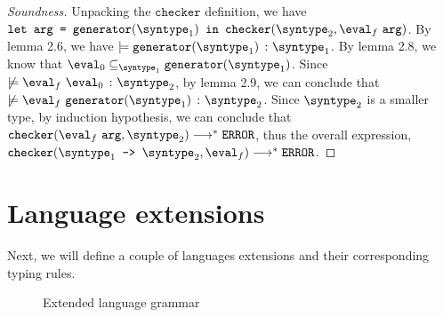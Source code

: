 \begin{proof}[Soundness]
  Unpacking the $\texttt{checker}$ definition, we have $\letin{\texttt{arg}}{\mkgen{\syntype_1}}{\mkche{\syntype_2}{\eval_f \ \texttt{arg}}}$. By lemma 2.6, we have $\models \hastype{\mkgen{\syntype_1}}{\syntype_1}$. By lemma 2.8, we know that $\eval_0 \subseteq_{\syntype_1} \mkgen{\syntype_1}$. Since $\not \models \hastype{\eval_f \ \eval_0}{\syntype_2}$, by lemma 2.9, we can conclude that $\not \models \hastype{\eval_f \ \mkgen{\syntype_1}}{\syntype_2}$. Since $\syntype_2$ is a smaller type, by induction hypothesis, we can conclude that $\mkche{\eval_f \ \texttt{arg}}{\syntype_2} \smallsteps[] \eerror$, thus the overall expression, $\mkche{\mkfun{\syntype_1}{\syntype_2}}{\eval_f} \smallsteps[] \eerror$.

\end{proof}

\section{Language extensions}

Next, we will define a couple of languages extensions and their corresponding typing rules.

\begin{figure}[hbt!]%
  \begin{grammar}
            \grule[expressions]{\expr}{
              \cdots
              \gor \vpoly
            }
            \grule[values]{\eval}{
              \cdots
              \gor \vpoly
            }
            \grule[types]{\syntype}{
              \cdots
              \gor \tpoly
              \gor \mkunion{\syntype}{\syntype}
              \gor \mkintersect{\syntype}{\syntype}
              \gor \mktset{\syntype}{\expr}
              \gor \mkdfun{\ev}{\syntype}{\syntype}
              \gor \mkmiu{\alpha}{\syntype}
          }
        \end{grammar}
    \caption{Extended language grammar}
    \label{ext_Grammar}
\end{figure}

